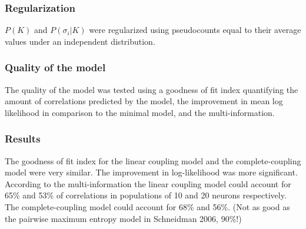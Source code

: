\documentclass[a4paper,12pt]{article}
\theoremstyle{definition}
\begin{document}
\subsubsection*{Regularization}
	$P(K)$ and $P(\sigma_i | K)$ were regularized using pseudocounts equal to their average values under an independent distribution.
	
\subsubsection*{Quality of the model}
	The quality of the model was tested using a goodness of fit index quantifying the amount of correlations predicted by the model, the improvement in mean log likelihood in comparison to the minimal model, and the multi-information. 
	
\subsubsection*{Results}
	The goodness of fit index for the linear coupling model and the complete-coupling model were very similar. The improvement in log-likelihood was more significant. According to the multi-information the linear coupling model could account for 65\% and 53\% of correlations in populations of 10 and 20 neurons respectively. The complete-coupling model could account for 68\% and 56\%. (Not as good as the pairwise maximum entropy model in Schneidman 2006, 90\%!)
\end{document}
